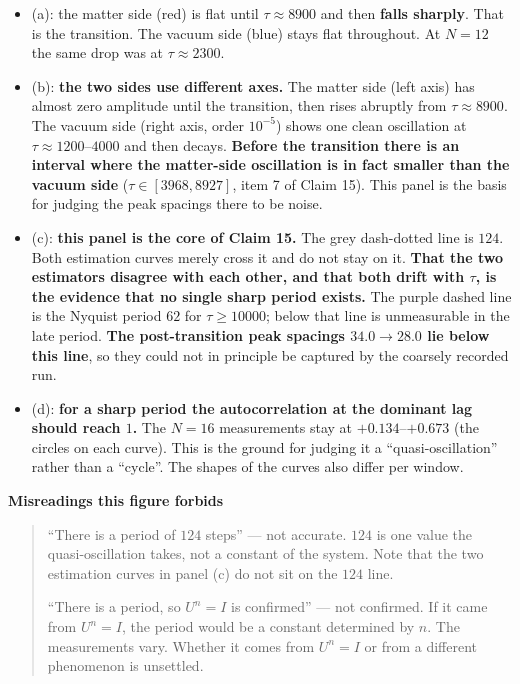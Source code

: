 \documentclass[
  10pt,
]{article}
\providecommand{\tightlist}{%
  \setlength{\itemsep}{0pt}\setlength{\parskip}{0pt}}
\begin{document}
\begin{itemize}
\tightlist
\item
  (a): the matter side (red) is flat until \(\tau\approx8900\) and then
  \textbf{falls sharply}. That is the transition. The vacuum side (blue)
  stays flat throughout. At \(N=12\) the same drop was at
  \(\tau\approx2300\).
\item
  (b): \textbf{the two sides use different axes.} The matter side (left
  axis) has almost zero amplitude until the transition, then rises
  abruptly from \(\tau\approx8900\). The vacuum side (right axis, order
  \(10^{-5}\)) shows one clean oscillation at
  \(\tau\approx1200\)--\(4000\) and then decays. \textbf{Before the
  transition there is an interval where the matter-side oscillation is
  in fact smaller than the vacuum side} (\(\tau\in[3968,8927]\), item 7
  of Claim 15). This panel is the basis for judging the peak spacings
  there to be noise.
\item
  (c): \textbf{this panel is the core of Claim 15.} The grey dash-dotted
  line is \(124\). Both estimation curves merely cross it and do not
  stay on it. \textbf{That the two estimators disagree with each other,
  and that both drift with \(\tau\), is the evidence that no single
  sharp period exists.} The purple dashed line is the Nyquist period
  \(62\) for \(\tau\ge10000\); below that line is unmeasurable in the
  late period. \textbf{The post-transition peak spacings \(34.0\to28.0\)
  lie below this line}, so they could not in principle be captured by
  the coarsely recorded run.
\item
  (d): \textbf{for a sharp period the autocorrelation at the dominant
  lag should reach \(1\).} The \(N=16\) measurements stay at
  \(+0.134\)--\(+0.673\) (the circles on each curve). This is the ground
  for judging it a ``quasi-oscillation'' rather than a ``cycle''. The
  shapes of the curves also differ per window.
\end{itemize}

\textbf{Misreadings this figure forbids}

\begin{quote}
``There is a period of \(124\) steps'' --- not accurate. \(124\) is one
value the quasi-oscillation takes, not a constant of the system. Note
that the two estimation curves in panel (c) do not sit on the \(124\)
line.

``There is a period, so \(U^n=I\) is confirmed'' --- not confirmed. If
it came from \(U^n=I\), the period would be a constant determined by
\(n\). The measurements vary. Whether it comes from \(U^n=I\) or from a
different phenomenon is unsettled.
\end{quote}
\end{document}
